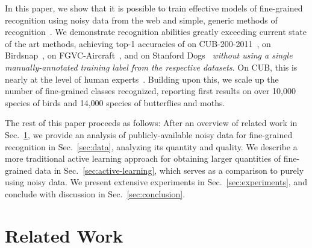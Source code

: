\documentclass[runningheads]{llncs}
\begin{document}
In this paper, we show that it is possible to train effective models of fine-grained recognition using noisy data from the web and simple, generic methods of recognition~\cite{szegedy2015rethinking,szegedy2014going}.
We demonstrate recognition abilities greatly exceeding current state of the art methods, achieving top-1 accuracies of  on CUB-200-2011~\cite{wahcub2002011},  on Birdsnap~\cite{bergbirdsnapcvpr2014},  on FGVC-Aircraft~\cite{maji13finegrained}, and  on Stanford Dogs~\cite{khosla2011novel} \emph{without using a single manually-annotated training label from the respective datasets}.
On CUB, this is nearly at the level of human experts~\cite{branson2014ignorant,horn2015}.
Building upon this, we scale up the number of fine-grained classes recognized, reporting first results on over 10,000 species of birds and 14,000 species of butterflies and moths.

The rest of this paper proceeds as follows:
After an overview of related work in Sec.~\ref{sec:related}, we provide an analysis of publicly-available noisy data for fine-grained recognition in Sec.~\ref{sec:data}, analyzing its quantity and quality.
We describe a more traditional active learning approach for obtaining larger quantities of fine-grained data in Sec.~\ref{sec:active-learning}, which serves as a comparison to purely using noisy data.
We present extensive experiments in Sec.~\ref{sec:experiments}, and conclude with discussion in Sec.~\ref{sec:conclusion}.


\section{Related Work}
\label{sec:related}
\end{document}
